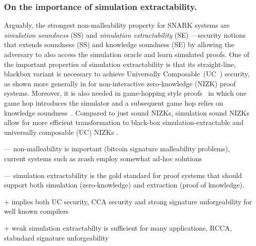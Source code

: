 \documentclass[runningheads,11pt]{llncs}
\begin{document}
	\subsubsection*{On the importance of simulation extractability.}
	Arguably, the strongest non-malleability property for SNARK systems are \emph{simulation soundness} (SS) and \emph{simulation extractability} (SE) \cite{FOCS:Sahai99,C:DDOPS01}---security notions that extends soundness (SS) and knowledge soundness (SE) by allowing the adversary to also access the simulation oracle and learn simulated proofs. 
	One of the important properties of simulation extractability is that its
	straight-line, blackbox variant is necessary to achieve Universally Composable~(UC~\cite{FOCS:Canetti01}) security, as shown more generally in 	\cite{STOC:CLOS02,AC:Groth06,EC:GroOstSah06} for non-interactive zero-knowledge (NIZK) proof systems. Moreover, it is also needed in game-hopping style proofs~\cite{EPRINT:Shoup04} in which one game hop
	introduces the simulator and a subsequent game hop relies on knowledge
	soundness~\cite{SP:KMSWP16,CCS:CamDriDub17}.
	Compared to just sound NIZKs, simulation sound NIZKs allow for more efficient transformation to black-box simulation-extractable and universally composable (UC) NIZKs \cite{AFRICACRYPT:Baghery19}. 

  --- non-malleability is important (bitcoin signature malleability problems), current
  systems such as zcash employ somewhat ad-hoc solutions

  --- simulation extractability is the gold standard for proof systems that
  should support both simulation (zero-knowledge) and extraction (proof of
  knowledge).

  + implies both UC security, CCA security and strong signature unforgeability
  for well known compilers

  + weak simulation extractabilty is sufficient for many applications, RCCA,
  stabndard signature unforgeability
	
		
\end{document}
